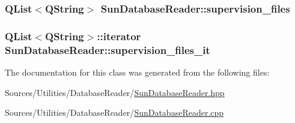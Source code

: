 \hypertarget{class_sun_database_reader_ac5afd4950a668e5cff2bc5c6ea024b60}{
\subsubsection[{supervision\+\_\+files}]{\setlength{\rightskip}{0pt plus 5cm}Q\+List$<$Q\+String$>$ Sun\+Database\+Reader\+::supervision\+\_\+files\hspace{0.3cm}{\ttfamily [private]}}}\label{class_sun_database_reader_ac5afd4950a668e5cff2bc5c6ea024b60}
\hypertarget{class_sun_database_reader_a78e30a0ac9cfa46c23dbdf8d37226b51}{
\subsubsection[{supervision\+\_\+files\+\_\+it}]{\setlength{\rightskip}{0pt plus 5cm}Q\+List$<$Q\+String$>$\+::iterator Sun\+Database\+Reader\+::supervision\+\_\+files\+\_\+it\hspace{0.3cm}{\ttfamily [private]}}}\label{class_sun_database_reader_a78e30a0ac9cfa46c23dbdf8d37226b51}


The documentation for this class was generated from the following files\+:\begin{DoxyCompactItemize}
\item 
Sources/\+Utilities/\+Database\+Reader/\hyperlink{_sun_database_reader_8hpp}{Sun\+Database\+Reader.\+hpp}\item 
Sources/\+Utilities/\+Database\+Reader/\hyperlink{_sun_database_reader_8cpp}{Sun\+Database\+Reader.\+cpp}\end{DoxyCompactItemize}
